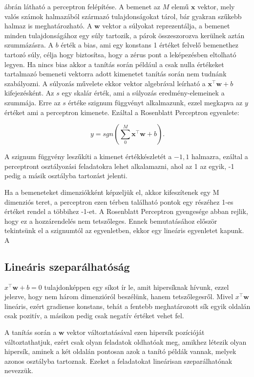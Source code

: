  ábrán látható a perceptron felépítése. A bemenet az $M$ elemű $ \boldsymbol x$ vektor, mely valós számok halmazából származó tulajdonságokat tárol, bár gyakran szűkebb halmaz is meghatározható. A $ \mathbf{w}$ vektor a súlyokat reprezentálja, a bemenet minden tulajdonságához egy súly tartozik, a párok összeszorozva kerülnek aztán szummázásra. A $b$ érték a bias, ami egy konstans 1 értéket felvelő bemenethez tartozó súly, célja hogy biztosítsa, hogy a zérus pont a leképezésben eltolható legyen. Ha nincs bias akkor a tanítás során például a csak nulla értékeket tartalmazó bemeneti vektorra adott kimenetet tanítás során nem tudnánk szabályozni. A súlyozás művelete ekkor vektor algebrával leírható a $\boldsymbol x^\intercal \boldsymbol w + b$ kifejezésként. Az $s$ egy skalár érték, ami a súlyozás eredmény-elemeinek a szummája. Erre az $s$ értéke szignum függvényt alkalmazunk, ezzel megkapva az $y$ értéket ami a perceptron kimenete. Ezáltal a Rosenblatt Perceptron egyenlete:

\begin{equation}
y = sgn\left( \sum_0^M \boldsymbol x^\intercal \boldsymbol w + b\right) .
\end{equation} 

A szignum függvény leszűkíti a kimenet értékkészletét a ${-1,1}$ halmazra, ezáltal a perceptront osztályozási feladatokra lehet alkalamazni, ahol az 1 az egyik, -1 pedig a másik osztályba tartozást jelenti.

Ha a bemeneteket dimenziókként képzeljük el, akkor kifeszítenek egy M dimenziós teret, a perceptron ezen térben található pontok egy részéhez 1-es értéket rendel a többihez -1-et. A Rosenblatt Perceptron gyengesége abban rejlik, hogy ez a hozzárendelés nem tetszőleges. Ennek bemutatásához először tekintsünk el a szignumtól az egyenletben, ekkor egy lineáris egyenletet kapunk. A 

\subsection{Lineáris szeparálhatóság}
\label{sec:linszep}

$x^\intercal \boldsymbol w + b = 0$ tulajdonképpen egy síkot ír le, amit hipersíknak hívunk, ezzel jelezve, hogy nem három dimenzióról beszélünk, hanem tetszőlegesről. Mivel $x^\intercal \boldsymbol w$ lineáris, ezért gradiense konstans, tehát a fentebb meghatározott sík egyik oldalán csak pozitív, a másikon pedig csak negatív értéket vehet fel.

A tanítás során a $\boldsymbol w$ vektor változtatásával ezen hipersík pozícióját változtathatjuk, ezért csak olyan feladatok oldhatóak meg, amikhez létezik olyan hipersík, aminek a két oldalán pontosan azok a tanító példák vannak, melyek azonos osztályba tartoznak. Ezeket a feladatokat lineárisan szeparálhatónak nevezzük.

